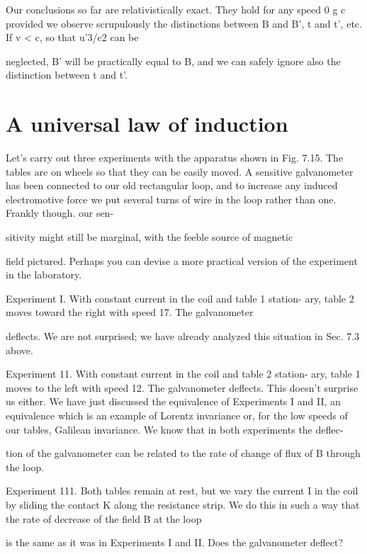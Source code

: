 Our conclusions so far are relativistically exact. They hold for
any speed 0 g c provided we observe scrupulously the distinctions
between B and B', t and t', etc. If v < c, so that u'3/c2 can be

neglected, B' will be practically equal to B, and we can safely ignore
also the distinction between t and t'.

\section{A universal law of induction}

Let's carry out three experiments with the apparatus shown in
Fig. 7.15. The tables are on wheels so that they can be easily moved.
A sensitive galvanometer has been connected to our old rectangular
loop, and to increase any induced electromotive force we put several
turns of wire in the loop rather than one. Frankly though. our sen-

sitivity might still be marginal, with the feeble source of magnetic

field pictured. Perhaps you can devise a more practical version of
the experiment in the laboratory.

Experiment I. With constant current in the coil and table 1 station-
ary, table 2 moves toward the right with speed 17. The galvanometer

deflects. We are not surprised; we have already analyzed this situation
in Sec. 7.3 above.

Experiment 11. With constant current in the coil and table 2 station-
ary, table 1 moves to the left with speed 12. The galvanometer
deflects. This doesn't surprise us either. We have just discussed the
equivalence of Experiments I and II, an equivalence which is an example
of Lorentz invariance or, for the low speeds of our tables,
Galilean invariance. We know that in both experiments the deflec-

tion of the galvanometer can be related to the rate of change of flux
of B through the loop.

Experiment 111. Both tables remain at rest, but we vary the current
I in the coil by sliding the contact K along the resistance strip. We
do this in such a way that the rate of decrease of the field B at the loop

is the same as it was in Experiments I and II. Does the galvanometer
deflect?

